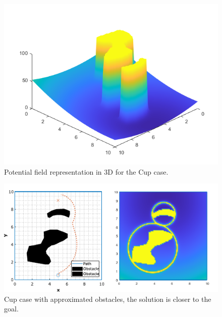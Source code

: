 \documentclass{IEEEtaes}
\begin{document}
{\begin{figure}
    \vspace{-1em}
    \begin{center}    
        \includegraphics[width=0.8\linewidth]{cup-pot.png}
    \end{center}
     \caption{Potential field representation in 3D for the Cup case.}
     \label{three}
\end{figure}



\begin{figure}
    \vspace{-1em}
    \begin{center}    
        \includegraphics[width=0.8\linewidth]{simple-4.pdf}
    \end{center}
     \caption{Cup case with approximated obstacles, the solution is closer to the goal.}
     \label{three}
\end{figure}

}
\end{document}
